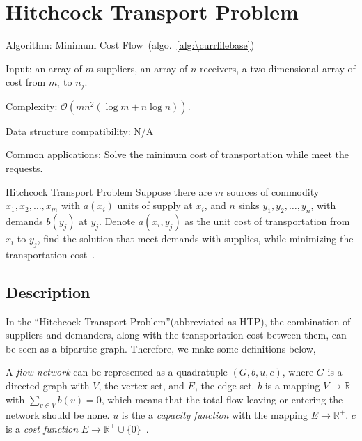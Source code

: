 \documentclass[catalog.tex]{subfiles}
\begin{document}
\def\pbname{Hitchcock Transport Problem} %

\section{\pbname} 

\begin{overview}
\item [Algorithm:] Minimum Cost Flow~(algo.~\ref{alg:\currfilebase}) 
\item [Input:] an array of $m$ suppliers, an array of $n$ receivers, a two-dimensional array of cost from $m_i$ to $n_j$.
\item [Complexity:] $\mathcal{O}(mn^2 (\log m + n\log n))$.
\item [Data structure compatibility:] N/A
\item [Common applications:] Solve the minimum cost of transportation while meet the requests.
\end{overview}


\begin{problem}{\pbname}
	Suppose there are $m$ sources of commodity $x_1, x_2, \dots, x_m$ with $a(x_i)$ units of supply at $x_i$, and $n$ sinks $y_1, y_2, \dots, y_n$, with demands $b(y_j)$ at $y_j$. Denote $a(x_i, y_j)$ as the unit cost of transportation from $x_i$ to $y_j$, find the solution that meet demands with supplies, while minimizing the transportation cost~\cite{hitchcock_1941}.
\end{problem}


\subsection*{Description}
In the ``Hitchcock Transport Problem''(abbreviated as HTP), the combination of suppliers and demanders, along with the transportation cost between them, can be seen as a bipartite graph. Therefore, we make some definitions below,

A \textit{flow network} can be represented as a quadratuple $(G, b, u, c)$, where $G$ is a directed graph with $V$, the vertex set, and $E$, the edge set. $b$ is a mapping $V \rightarrow \mathbb{R}$ with $\sum_{v\in V} b(v) = 0$, which means that the total flow leaving or entering the network should be none. $u$ is the a \textit{capacity function} with the mapping $E \rightarrow \mathbb{R}^{+}$. $c$ is a \textit{cost function} $E \rightarrow \mathbb{R}^{+} \cup \{0\}$~\cite{brenner_2008}.
\end{document}
